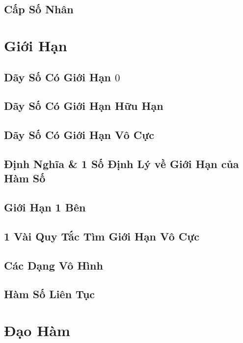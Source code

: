 \documentclass[oneside]{book}
\numberwithin{equation}{section}
\begin{document}
\section{Cấp Số Nhân}


\chapter{Giới Hạn}

\section{Dãy Số Có Giới Hạn $0$}

\section{Dãy Số Có Giới Hạn Hữu Hạn}

\section{Dãy Số Có Giới Hạn Vô Cực}

\section{Định Nghĩa \& 1 Số Định Lý về Giới Hạn của Hàm Số}

\section{Giới Hạn 1 Bên}

\section{1 Vài Quy Tắc Tìm Giới Hạn Vô Cực}

\section{Các Dạng Vô Hình}

\section{Hàm Số Liên Tục}


\chapter{Đạo Hàm}
\end{document}
